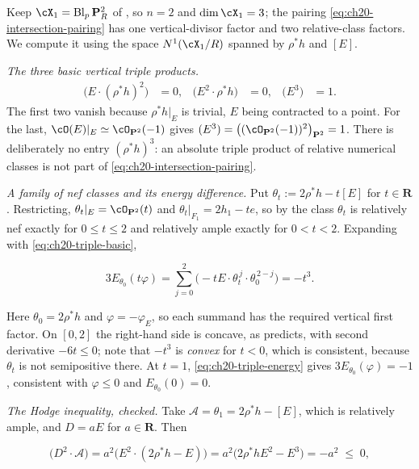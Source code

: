\begin{example}
\label{ex:ch20-triple-products}
Keep $\cX_1=\operatorname{Bl}_p\mathbf P^2_R$ of
, so $n=2$ and $\dim\cX_1=3$; the
pairing \eqref{eq:ch20-intersection-pairing} has one vertical-divisor factor
and two relative-class factors.  We compute it using the space
$N^1(\cX_1/R)$ spanned by $\rho^*h$ and $[E]$.

\emph{The three basic vertical triple products.}
\begin{align}
\label{eq:ch20-triple-basic}
 \bigl(E\cdot(\rho^*h)^2\bigr)&=0, &
 \bigl(E^2\cdot\rho^*h\bigr)&=0, &
 \bigl(E^3\bigr)&=1 .
\end{align}
The first two vanish because $\rho^*h|_E$ is trivial, $E$ being
contracted to a point.  For the last,
$\cO(E)|_E\simeq\cO_{\mathbf P^2}(-1)$ gives
$(E^3)=\bigl((\cO_{\mathbf P^2}(-1))^2\bigr)_{\mathbf P^2}=1$.
There is deliberately no entry $(\rho^*h)^3$: an absolute triple product
of relative numerical classes is not part of
\eqref{eq:ch20-intersection-pairing}.

\emph{A family of nef classes and its energy difference.}  Put
$\theta_t:=2\rho^*h-t[E]$ for $t\in\mathbf R$.  Restricting,
$\theta_t|_E=\cO_{\mathbf P^2}(t)$ and
$\theta_t|_{F_1}=2h_1-te$, so by
 the class $\theta_t$ is relatively nef
exactly for $0\leq t\leq2$ and relatively ample exactly for
$0<t<2$.  Expanding with \eqref{eq:ch20-triple-basic},

\begin{equation}
\label{eq:ch20-triple-energy}
 3E_{\theta_0}(t\varphi)
 =\sum_{j=0}^2\bigl(-tE\cdot\theta_t^{\,j}\cdot
                      \theta_0^{\,2-j}\bigr)
 =-t^3 .
\end{equation}

Here $\theta_0=2\rho^*h$ and $\varphi=-\varphi_E$, so each summand has
the required vertical first factor.  On $[0,2]$ the right-hand side is
concave, as  predicts, with second derivative
$-6t\leq0$; note that $-t^3$ is \emph{convex} for $t<0$, which is
consistent, because $\theta_t$ is not semipositive there.  At $t=1$,
\eqref{eq:ch20-triple-energy} gives
$3E_{\theta_0}(\varphi)=-1$, consistent with $\varphi\leq0$ and
$E_{\theta_0}(0)=0$.

\emph{The Hodge inequality, checked.}  Take $\mathcal A=\theta_1=2\rho^*h-[E]$,
which is relatively ample, and $D=aE$ for $a\in\mathbf R$.  Then

\begin{equation}
\label{eq:ch20-triple-hodge-check}
 \bigl(D^2\cdot\mathcal A\bigr)
 =a^2\bigl(E^2\cdot(2\rho^*h-E)\bigr)
 =a^2\bigl(2\rho^*hE^2-E^3\bigr)
 =-a^2\;\leq\;0 ,
\end{equation}


\end{example}
